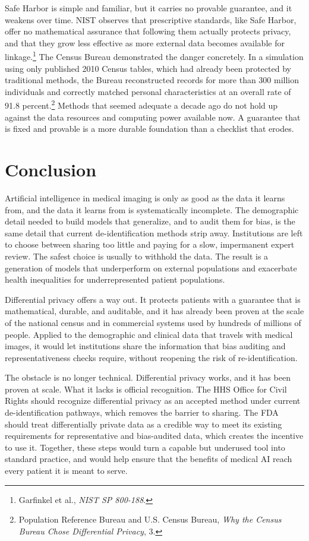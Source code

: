 \documentclass[11pt]{article}
\begin{document}
Safe Harbor is simple and familiar, but it carries no provable guarantee, and it weakens over time. NIST observes that prescriptive standards, like Safe Harbor, offer no mathematical assurance that following them actually protects privacy, and that they grow less effective as more external data becomes available for linkage.\footnote{Garfinkel et al., \textit{NIST SP 800-188}.} The Census Bureau demonstrated the danger concretely. In a simulation using only published 2010 Census tables, which had already been protected by traditional methods, the Bureau reconstructed records for more than 300 million individuals and correctly matched personal characteristics at an overall rate of 91.8 percent.\footnote{Population Reference Bureau and U.S. Census Bureau, \textit{Why the Census Bureau Chose Differential Privacy}, 3.} Methods that seemed adequate a decade ago do not hold up against the data resources and computing power available now. A guarantee that is fixed and provable is a more durable foundation than a checklist that erodes.

\section{Conclusion}

Artificial intelligence in medical imaging is only as good as the data it learns from, and the data it learns from is systematically incomplete. The demographic detail needed to build models that generalize, and to audit them for bias, is the same detail that current de-identification methods strip away. Institutions are left to choose between sharing too little and paying for a slow, impermanent expert review. The safest choice is usually to withhold the data. The result is a generation of models that underperform on external populations and exacerbate health inequalities for underrepresented patient populations.

Differential privacy offers a way out. It protects patients with a guarantee that is mathematical, durable, and auditable, and it has already been proven at the scale of the national census and in commercial systems used by hundreds of millions of people. Applied to the demographic and clinical data that travels with medical images, it would let institutions share the information that bias auditing and representativeness checks require, without reopening the risk of re-identification.

The obstacle is no longer technical. Differential privacy works, and it has been proven at scale. What it lacks is official recognition. The HHS Office for Civil Rights should recognize differential privacy as an accepted method under current de-identification pathways, which removes the barrier to sharing. The FDA should treat differentially private data as a credible way to meet its existing requirements for representative and bias-audited data, which creates the incentive to use it. Together, these steps would turn a capable but underused tool into standard practice, and would help ensure that the benefits of medical AI reach every patient it is meant to serve.
\end{document}
